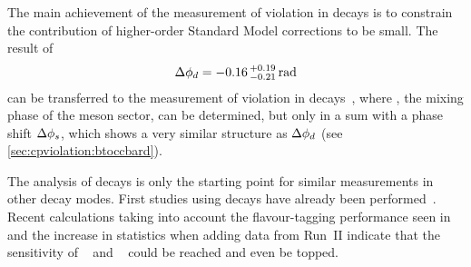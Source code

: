 The main achievement of the measurement of \CP violation in \BdToDD decays is
to constrain the contribution of higher-order Standard Model corrections to be
small. The result of
\begin{align*}
	\Delta {\ensuremath{\phi_{{d}}}} = -0.16\,^{+0.19}_{-0.21}\,\si{\radian}
\end{align*}
can be transferred to the measurement of \CP violation in \BsToDsDs
decays~\cite{LHCb-PAPER-2014-051}, where \phis, the mixing phase of the \Bs
meson sector, can be determined, but only in a sum with a phase shift $\Delta
{\ensuremath{\phi_{{s}}}}$, which shows a very similar structure as $\Delta {\ensuremath{\phi_{{d}}}}$ (see
\cref{sec:cpviolation:btoccbard}).

The analysis of \BdToDD decays is only the starting point for similar
measurements in other \allBToDD decay modes. First studies using \BdToDstD
decays have already been performed~\cite{BToDstDthesis}. Recent calculations
taking into account the flavour-tagging performance seen in \BdToDD and the
increase in statistics when adding data from Run~II indicate that the
sensitivity of \babar~\cite{Aubert:2008ah} and \belle~\cite{Rohrken:2012ta}
could be reached and even be topped.

